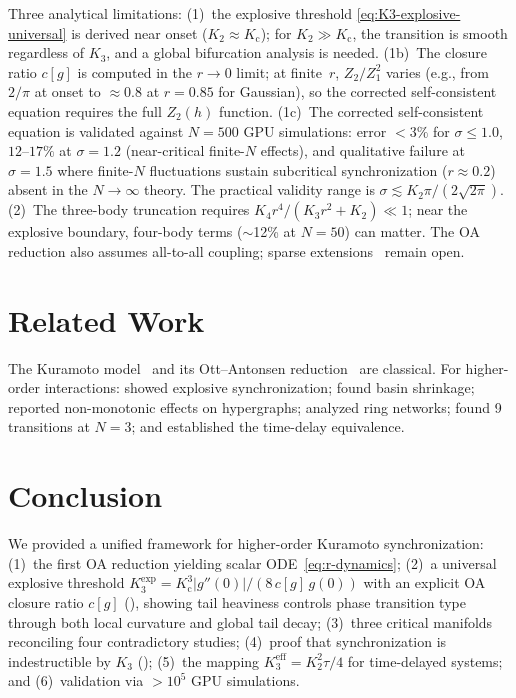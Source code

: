 \documentclass{article}
\newcommand{\Kc}{K_{\mathrm{c}}}
\begin{document}
Three analytical limitations: (1)~the explosive threshold
\eqref{eq:K3-explosive-universal} is derived near onset ($K_2\approx\Kc$);
for $K_2\gg\Kc$, the transition is smooth regardless of $K_3$, and a global
bifurcation analysis is needed.  (1b)~The closure ratio $c[g]$ is computed
in the $r\to 0$ limit; at finite~$r$, $Z_2/Z_1^2$ varies (e.g., from
$2/\pi$ at onset to $\approx 0.8$ at $r=0.85$ for Gaussian), so the
corrected self-consistent equation requires the full $Z_2(h)$ function.
(1c)~The corrected self-consistent equation is validated against
$N\!=\!500$ GPU simulations: error $<3\%$ for $\sigma\le 1.0$,
$12$--$17\%$ at $\sigma\!=\!1.2$ (near-critical finite-$N$ effects),
and qualitative failure at $\sigma\!=\!1.5$ where finite-$N$ fluctuations
sustain subcritical synchronization ($r\!\approx\!0.2$) absent in the
$N\!\to\!\infty$ theory.  The practical validity range is
$\sigma \lesssim K_2\pi/(2\sqrt{2\pi})$.
(2)~The three-body truncation requires $K_4 r^4/(K_3 r^2+K_2)\ll 1$;
near the explosive boundary, four-body terms ($\sim$12\% at $N\!=\!50$) can
matter.  The OA reduction also assumes all-to-all coupling; sparse
extensions~\citep{Muolo2025} remain open.


\section{Related Work}
\label{sec:related}

\noindent The Kuramoto model~\citep{Kuramoto1984} and its Ott--Antonsen
reduction~\citep{OttAntonsen2008} are classical.  For higher-order
interactions: \citet{Skardal2020} showed explosive synchronization;
\citet{Zhang2024} found basin shrinkage; \citet{Muolo2025} reported
non-monotonic effects on hypergraphs; \citet{Wang2025} analyzed ring
networks; \citet{Dai2025} found 9 transitions at $N\!=\!3$; and
\citet{Muolo2025delay} established the time-delay equivalence.


\section{Conclusion}
\label{sec:conclusion}

We provided a unified framework for higher-order Kuramoto synchronization:
(1)~the first OA reduction yielding scalar ODE~\eqref{eq:r-dynamics};
(2)~a universal explosive threshold $K_3^{\mathrm{exp}}\!=\!\Kc^3|g''(0)|/(8\,c[g]\,g(0))$
with an explicit OA closure ratio $c[g]$ (), showing tail
heaviness controls phase transition type through both local curvature and global
tail decay;
(3)~three critical manifolds reconciling four contradictory studies;
(4)~proof that synchronization is indestructible by $K_3$ ();
(5)~the mapping $K_3^{\mathrm{eff}}\!=\!K_2^2\tau/4$ for time-delayed systems;
and (6)~validation via $>10^5$ GPU simulations.
\end{document}
